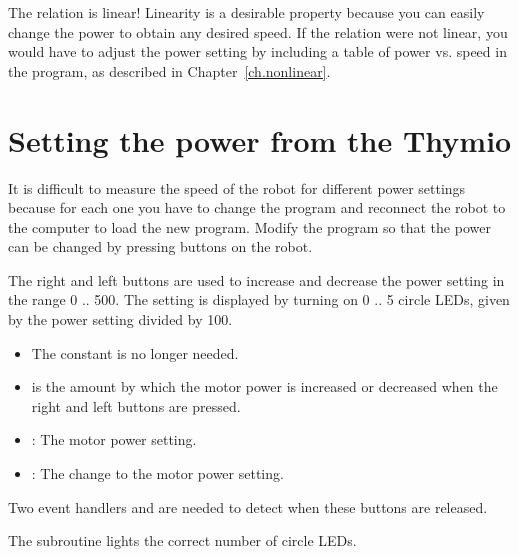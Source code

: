 The relation is linear! Linearity is a desirable property because you
can easily change the power to obtain any desired speed. If the relation
were not linear, you would have to adjust the power setting by including
a table of power vs. speed in the program, as described in
Chapter~\ref{ch.nonlinear}.

\section{Setting the power from the Thymio}


It is difficult to measure the speed of the robot for different power
settings because for each one you have to change the program and
reconnect the robot to the computer to load the new program. Modify the
program so that the power can be changed by pressing buttons on the
robot.


The right and left buttons are used to increase and decrease the power
setting in the range 0 .. 500. The setting is displayed by turning on 0
.. 5 circle LEDs, given by the power setting divided by 100.


\begin{itemize}
\item The constant  is no longer needed.
\item {} is the amount by which the motor power is increased
or decreased when the right and left buttons are pressed.
\end{itemize}


\begin{itemize}
\item {}: The motor power setting.
\item {}: The change to the motor power setting.
\end{itemize}



Two event handlers  and  are needed to
detect when these buttons are released.

The subroutine  lights the correct number of
circle LEDs.

\pagebreak[4]


